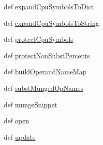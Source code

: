 \begin{DoxyCompactItemize}
def \hyperlink{classisa__parser_1_1ISAParser_a79be34860ed1ccdfa7c4a377aa9ca42b}{expandCpuSymbolsToDict}
\item 
def \hyperlink{classisa__parser_1_1ISAParser_a83ebf1a3fa500d1349a978fd6ad0f128}{expandCpuSymbolsToString}
\item 
def \hyperlink{classisa__parser_1_1ISAParser_a2f6c17f128739cc7bc4104ed758a34db}{protectCpuSymbols}
\item 
def \hyperlink{classisa__parser_1_1ISAParser_a2239b832b8c15269ab3c1a421eb74938}{protectNonSubstPercents}
\item 
def \hyperlink{classisa__parser_1_1ISAParser_a1fcd2036bbab05b2b16f72991d5749a7}{buildOperandNameMap}
\item 
def \hyperlink{classisa__parser_1_1ISAParser_a64d2fc428be722d00820418561b2a57b}{substMungedOpNames}
\item 
def \hyperlink{classisa__parser_1_1ISAParser_a9d0cb7c9fb831f3a51bcfa9398e120c5}{mungeSnippet}
\item 
def \hyperlink{classisa__parser_1_1ISAParser_ae4b82667a73596ae2d8042e9b4be8a95}{open}
\item 
def \hyperlink{classisa__parser_1_1ISAParser_abe52b977c101e59f342489ed18140819}{update}
\end{DoxyCompactItemize}
